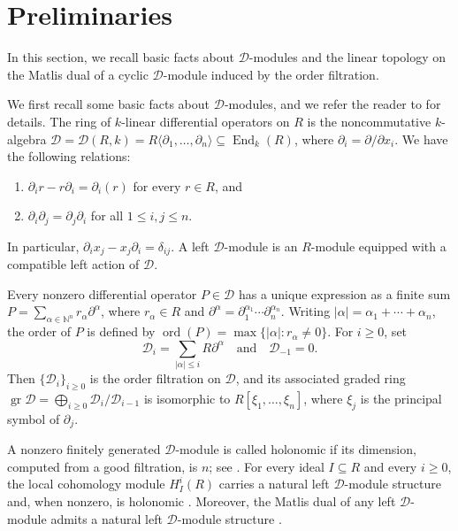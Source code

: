 \documentclass[11pt]{amsart}
\theoremstyle{definition}
\newcommand{\D}{\mathcal D}
\DeclareMathOperator{\End}{End}
\DeclareMathOperator{\ord}{ord}
\begin{document}
\section{Preliminaries}
In this section, we recall basic facts about $\D$-modules and the linear topology on the Matlis dual of a cyclic $\D$-module induced by the order filtration.
\par
We first recall some basic facts about $\D$-modules, and we refer the reader to \cite{Bjork} for details. The ring of $k$-linear differential operators on $R$ is the noncommutative $k$-algebra $\D=\D(R,k)=R\langle\partial_1,\ldots,\partial_n\rangle\subseteq\End_k(R)$, where $\partial_i=\partial/\partial x_i$. We have the following relations:
\begin{enumerate}
\item $\partial_i r-r\partial_i=\partial_i(r)$ for every $r\in R$, and
 \item $\partial_i\partial_j=\partial_j\partial_i$ for all $1\leq i,j\leq n$. 
\end{enumerate}
In particular, $\partial_i x_j-x_j\partial_i=\delta_{ij}$. A left $\D$-module is an $R$-module equipped with a compatible left action of $\D$.

Every nonzero differential operator $P\in \D$ has a unique expression as a finite sum $P=\sum_{\alpha\in\mathbb N^n}r_\alpha\partial^\alpha$, where $r_\alpha\in R$ and $\partial^\alpha=\partial_1^{\alpha_1}\cdots\partial_n^{\alpha_n}$. Writing $|\alpha|=\alpha_1+\cdots+\alpha_n$, the order of $P$ is defined by $\ord(P)=\max\{|\alpha|:r_\alpha\neq0\}$. For $i\geq0$, set
\begin{equation*}
\D_i=\sum_{|\alpha|\leq i}R\partial^\alpha \quad \text {and}\quad \mathcal D_{-1}=0.
\end{equation*}
Then $\{\D_i\}_{i\geq0}$ is the order filtration on $\D$, and its associated graded ring $\operatorname{gr}\D=\bigoplus_{i\geq0}\D_i/\D_{i-1}$ is isomorphic to $R[\xi_1,\ldots,\xi_n]$, where $\xi_j$ is the principal symbol of $\partial_j$.

A nonzero finitely generated $\D$-module is called holonomic if its dimension, computed from a good filtration, is $n$; see \cite{Bjork}. For every ideal $I\subseteq R$ and every $i\geq0$, the local cohomology module $H_I^i(R)$ carries a natural left $\D$-module structure and, when nonzero, is holonomic \cite[Section~2]{Ly93}. Moreover, the Matlis dual of any left $\D$-module admits a natural left $\D$-module structure \cite[Proposition 4.17]{Sw}.
\end{document}
